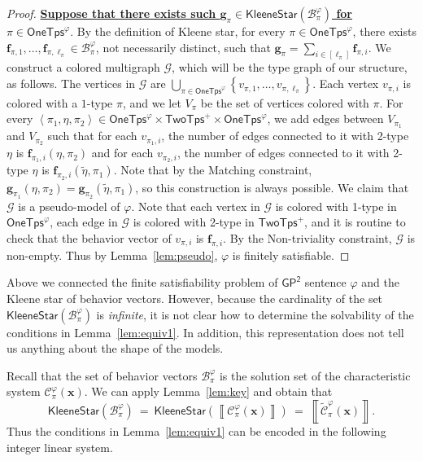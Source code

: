 \documentclass[10pt,a4paper]{article}
\theoremstyle{definition}
\theoremstyle{remark}
\newcommand{\cB}{\mathcal{B}}
\newcommand{\cC}{\mathcal{C}}
\newcommand{\cCtilde}{\tilde{\mathcal{C}}}
\newcommand{\cG}{\mathcal{G}}
\newcommand{\bff}{\mathbf{f}}
\newcommand{\bfg}{\mathbf{g}}
\newcommand{\bfx}{\mathbf{x}}
\newcommand{\twotypes}{\mathsf{TwoTps}}
\newcommand{\Onetypes}{\mathsf{OneTps}}
\newcommand{\GPtwo}   {\mathsf{GP^2}}
\newcommand{\set}[1]         {\left\{ #1 \right\}}
\newcommand{\tuple}[1]       {\left\langle #1 \right\rangle}
\newcommand{\intsinterval}[1]{{\left[ #1 \right]}}
\newcommand{\dual}[1] {\widetilde{ #1 }}
\newcommand{\kstar}[1] {\mathsf{KleeneStar}\left( #1 \right)}
\newcommand{\sol}[1] {\left\llbracket #1 \right\rrbracket}
\begin{document}
\begin{proof}
    \textbf{\uline{Suppose that there exists such $\bfg_\pi \in \kstar{\cB^\varphi_\pi}$ for $\pi \in \Onetypes^\varphi$}}.
    By the definition of Kleene star,
    for every $\pi \in \Onetypes^\varphi$,
    there exists $\bff_{\pi, 1}, \ldots, \bff_{\pi, \ell_\pi} \in \cB^\varphi_\pi$,
    not necessarily distinct,
    such that $\bfg_\pi = \sum_{i \in \intsinterval{\ell_\pi}} \bff_{\pi, i}$. 
    We construct a colored multigraph $\cG$, which will be the type graph of our structure, as follows.
    The vertices in $\cG$ are
    $\bigcup_{\pi \in \Onetypes^\varphi}
    \set{v_{\pi, 1}, \ldots, v_{\pi, \ell_\pi}}$.
    Each vertex $v_{\pi, i}$ is colored with a $1$-type $\pi$,
    and we let $V_{\pi}$ be the set of vertices colored with $\pi$.
    For every $\tuple{\pi_1, \eta, \pi_2} \in \Onetypes^\varphi \times \twotypes^+ \times \Onetypes^\varphi$,
    we add edges between $V_{\pi_1}$ and $V_{\pi_2}$ 
    such that
    for each $v_{\pi_1, i}$, the number of edges connected to it with 2-type $\eta$ is $\bff_{\pi_1, i}(\eta, \pi_2)$ and 
    for each $v_{\pi_2, i}$, the number of edges connected to it with 2-type $\eta$ is $\bff_{\pi_2, i}(\dual{\eta}, \pi_1)$.
    Note that by the Matching constraint,
    $\bfg_{\pi_1}(\eta, \pi_2) = \bfg_{\pi_2}(\dual{\eta}, \pi_1)$,
    so this construction is always possible.
    We claim that $\cG$ is a pseudo-model of $\varphi$.
    Note that each vertex in $\cG$ is colored with 1-type in $\Onetypes^\varphi$,
    each edge in $\cG$ is colored with 2-type in $\twotypes^+$,
    and it is routine to check that the behavior vector of $v_{\pi, i}$ is $\bff_{\pi, i}$.
    By the Non-triviality constraint, $\cG$ is non-empty.
    Thus by Lemma~\ref{lem:pseudo}, $\varphi$ is finitely satisfiable.
\end{proof}

Above we connected the finite satisfiability problem of $\GPtwo$ sentence $\varphi$ and the Kleene star of behavior vectors.
However, because the cardinality of the set $\kstar{\cB^\varphi_\pi}$ is \emph{infinite},
it is not clear how  to determine the solvability of the conditions in Lemma~\ref{lem:equiv1}.
In addition, this representation does not tell us anything about the shape of the models.

Recall that the set of behavior vectors $\cB^\varphi_\pi$ is the solution set of the characteristic system $\cC^\varphi_\pi(\bfx)$.
We can apply Lemma~\ref{lem:key} and obtain that
\begin{equation*}
    \kstar{\cB^\varphi_\pi}
    \ =\ 
    \kstar{\sol{\cC^\varphi_\pi(\bfx)}}
    \ =\ 
    \sol{\cCtilde^\varphi_\pi(\bfx)}.
\end{equation*}
Thus the conditions in Lemma~\ref{lem:equiv1} can be encoded in the following integer linear system.
\end{document}
